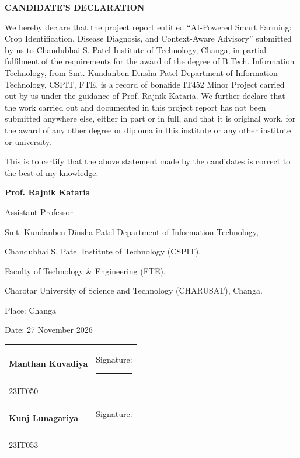 \documentclass[12pt,a4paper,oneside,openany]{report}
\begin{document}
\clearpage
{}
{}
\begin{center}
{\bfseries\large CANDIDATE'S DECLARATION}
\end{center}
\vspace{0.30cm}
\begingroup
\setlength{\parindent}{0pt}
We hereby declare that the project report entitled ``AI-Powered Smart Farming: Crop Identification, Disease Diagnosis, and Context-Aware Advisory'' submitted by us to Chandubhai S. Patel Institute of Technology, Changa, in partial fulfilment of the requirements for the award of the degree of B.Tech. Information Technology, from Smt. Kundanben Dinsha Patel Department of Information Technology, CSPIT, FTE, is a record of bonafide IT452 Minor Project carried out by us under the guidance of Prof. Rajnik Kataria. We further declare that the work carried out and documented in this project report has not been submitted anywhere else, either in part or in full, and that it is original work, for the award of any other degree or diploma in this institute or any other institute or university.

This is to certify that the above statement made by the candidates is correct to the best of my knowledge.

\vspace{0.5cm}
\noindent\textbf{Prof. Rajnik Kataria}\par
Assistant Professor\par
Smt. Kundanben Dinsha Patel Department of Information Technology,\par
Chandubhai S. Patel Institute of Technology (CSPIT),\par
Faculty of Technology \& Engineering (FTE),\par
Charotar University of Science and Technology (CHARUSAT), Changa.

\vspace{0.40cm}
Place: Changa\par
Date: 27 November 2026

\vspace{1cm}
\noindent\begin{tabular}{@{}P{1.55in}P{4.2in}@{}}
\textbf{Manthan Kuvadiya} & Signature: \rule{4.0cm}{0.4pt}\\
23IT050 & \\[0.70cm]
\textbf{Kunj Lunagariya} & Signature: \rule{4.0cm}{0.4pt}\\
23IT053 &
\end{tabular}
\endgroup
\end{document}
